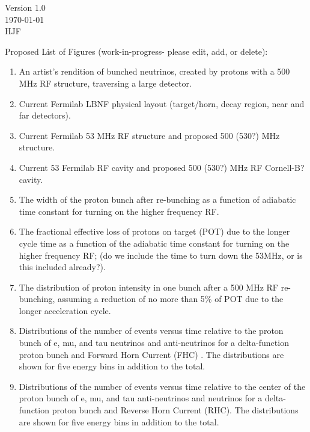 \documentclass[12pt]{article}
\begin{document}
\pagestyle{plain}
\begin{flushright}
Version 1.0\\
\today\\
HJF\\
\end{flushright}
%

Proposed List of Figures (work-in-progress- please edit, add, or delete):

\begin{enumerate}
\item An artist's rendition of bunched neutrinos, created by protons
with a 500 MHz RF structure, traversing a large detector.


\item Current Fermilab LBNF physical layout (target/horn, decay region, near
and far detectors).


\item Current Fermilab 53 MHz RF structure and proposed 500 (530?) MHz structure.

\item Current 53 Fermilab RF cavity and proposed 500 (530?) MHz RF
Cornell-B? cavity.

\item The width of the proton bunch after re-bunching as a function of
adiabatic time constant for turning on the higher frequency RF.

\item The fractional effective loss of protons on target (POT) 
due to the longer cycle time as a function of the adiabatic time
constant for turning on the higher frequency RF; (do we include the
time to turn down the 53MHz, or is this included already?).

\item The distribution of proton intensity in one bunch after a 500 MHz RF
re-bunching, assuming a reduction of no more than 5\% of POT due to the longer
acceleration cycle.

\item Distributions of the number of events versus time relative to
  the proton bunch of e, mu, and tau neutrinos and anti-neutrinos for
  a delta-function proton bunch and Forward Horn Current (FHC) . The
  distributions are shown for five energy bins in addition to the
  total.

\item Distributions of the number of events versus time relative to
  the center of the proton bunch of e, mu, and tau anti-neutrinos and
  neutrinos for a delta-function proton bunch and Reverse Horn Current
  (RHC).  The distributions are shown for five energy bins in addition
  to the total.


\end{enumerate}
\end{document}
